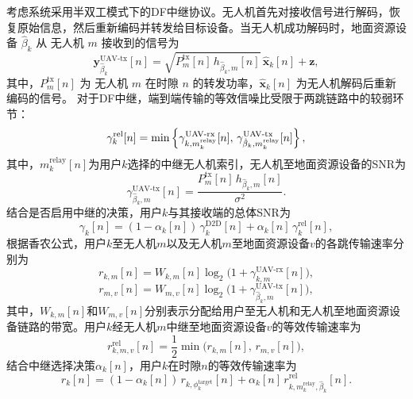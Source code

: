 考虑系统采用半双工模式下的DF中继协议。无人机首先对接收信号进行解码，恢复原始信息，然后重新编码并转发给目标设备。当无人机成功解码时，地面资源设备 $\hat{\beta}_k$ 从 无人机 $m$ 接收到的信号为
\begin{equation}
\mathbf{y}_{\hat\beta_k}^{\text{UAV-tx}}[n]=\sqrt{P_{m}^{\text{tx}}[n]\,h_{\hat\beta_k,m}[n]}\,\hat{\mathbf{x}}_k[n]+\mathbf{z},
\end{equation}
其中，$P_{m}^{\text{tx}}[n]$ 为 无人机 $m$ 在时隙 $n$ 的转发功率，$\hat{\mathbf{x}}_k[n]$ 为无人机解码后重新编码的信号。
对于DF中继，端到端传输的等效信噪比受限于两跳链路中的较弱环节：
\begin{equation}
\gamma_k^{\rm rel}[n]=\min\left\{\gamma_{k,m_k^{\text{relay}}}^{\text{UAV-rx}}[n],\,\gamma_{\hat\beta_k,m_k^{\text{relay}}}^{\text{UAV-tx}}[n]\right\},
\end{equation}
其中，$m_k^{\text{relay}}[n]$为用户$k$选择的中继无人机索引，无人机至地面资源设备的SNR为
\begin{equation}
\gamma_{\hat\beta_k,m}^{\text{UAV-tx}}[n]=\frac{P_{m}^{\text{tx}}[n]\,h_{\hat\beta_k,m}[n]}{\sigma^{2}}.
\end{equation}
结合是否启用中继的决策，用户$k$与其接收端的总体SNR为
\begin{equation}\label{eq:snr_total}
\gamma_k[n]=(1-\alpha_k[n])\,\gamma _k^{\text{D2D}}[n]+\alpha_k[n]\,\gamma _k^{\text{rel}}[n],
\end{equation}
根据香农公式，用户$k$至无人机$m$以及无人机$m$至地面资源设备$v$的各跳传输速率分别为
\begin{equation}
r_{k,m}[n] = W_{k,m}[n] \log_2\!\big(1 + \gamma_{k,m}^{\text{UAV-rx}}[n]\big),
\end{equation}
\begin{equation}
r_{m,v}[n] = W_{m,v}[n] \log_2\!\big(1 + \gamma_{\hat\beta_k,m}^{\text{UAV-tx}}[n]\big),
\end{equation}
其中，$W_{k,m}[n]$和$W_{m,v}[n]$分别表示分配给用户至无人机和无人机至地面资源设备链路的带宽。用户$k$经无人机$m$中继至地面资源设备$v$的等效传输速率为
\begin{equation}
r_{k,m,v}^{\text{rel}}[n] = \frac{1}{2}\min\!\big(r_{k,m}[n],\, r_{m,v}[n]\big),
\end{equation}
结合中继选择决策$\alpha_k[n]$，用户$k$在时隙$n$的等效传输速率为
\begin{equation}\label{eq:r_k}
r_k[n] = (1-\alpha_k[n])\, r_{k,\phi_k^{\text{target}}}[n] + \alpha_k[n]\, r_{k,m_k^{\text{relay}},\hat\beta_k}^{\text{rel}}[n].
\end{equation}

